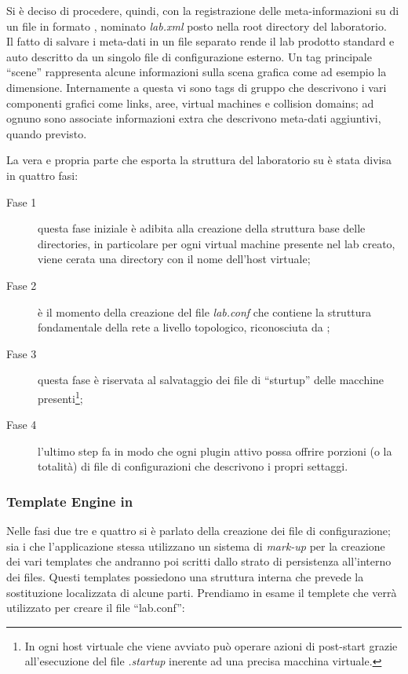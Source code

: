 Si è deciso di procedere, quindi, con la registrazione delle meta-informazioni su di un file in formato \xml{}, nominato \emph{lab.xml} posto nella root directory del laboratorio.\\
Il fatto di salvare i meta-dati in un file separato rende il lab prodotto standard e auto descritto da un singolo file di configurazione esterno.
Un tag principale ``scene'' rappresenta alcune informazioni sulla scena grafica come ad esempio la dimensione. Internamente a questa vi sono tags di gruppo che descrivono i vari componenti grafici come links, aree, virtual machines e collision domains; ad ognuno sono associate informazioni extra che descrivono meta-dati aggiuntivi, quando previsto.

La vera e propria parte che esporta la struttura del laboratorio su \fs{} è stata divisa in quattro fasi:
\begin{description}
\item[Fase 1] questa fase iniziale è adibita alla creazione della struttura base delle directories, in particolare per ogni virtual machine presente nel lab creato, viene cerata una directory con il nome dell'host virtuale;
\item[Fase 2] è il momento della creazione del file \emph{lab.conf} che contiene la struttura fondamentale della rete a livello topologico, riconosciuta da \netkit{};
\item[Fase 3] questa fase è riservata al salvataggio dei file di ``sturtup'' delle macchine presenti\footnote{In \netkit{} ogni host virtuale che viene avviato può operare azioni di post-start grazie all'esecuzione del file \emph{.startup} inerente ad una precisa macchina virtuale.};
\item[Fase 4] l'ultimo step fa in modo che ogni plugin attivo possa offrire porzioni (o la totalità) di file di configurazioni che descrivono i propri settaggi.
\end{description}

\subsubsection*{Template Engine in \visualnetkit{}}
Nelle fasi due tre e quattro si è parlato della creazione dei file di configurazione; sia i \plugin{} che l'applicazione stessa utilizzano un sistema di \emph{mark-up} per la creazione dei vari templates che andranno poi scritti dallo strato di persistenza all'interno dei files. Questi templates possiedono una struttura interna che prevede la sostituzione localizzata di alcune parti. Prendiamo in esame il templete che verrà utilizzato per creare il file ``lab.conf'':

